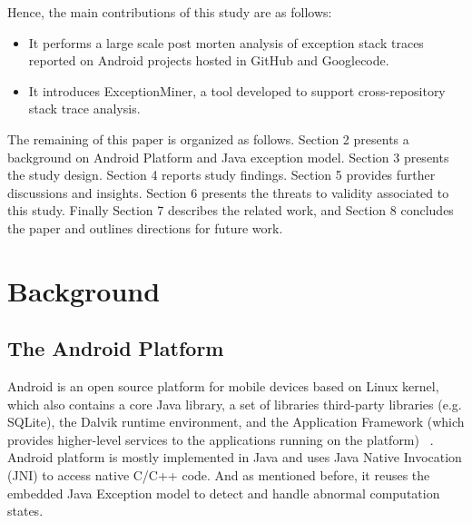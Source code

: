 \documentclass[conference]{IEEEtran}
\begin{document}
Hence, the main contributions of this study are as follows:
\begin{itemize}

  \item  It performs a large scale post morten analysis of exception stack traces reported on Android projects hosted in GitHub and Googlecode.

  \item  It introduces ExceptionMiner, a tool developed to support cross-repository stack trace
    analysis.

\end{itemize}



The remaining of this paper is organized as follows. Section 2 presents a
background on Android Platform and Java exception model. 
Section 3 presents the study design. Section 4 reports study findings. 
Section 5 provides further discussions and insights.
Section 6 presents the threats to validity associated to this study. Finally Section
7 describes the related work, and Section 8 concludes the paper and outlines
directions for future work.

\section{Background}
\label{sec:back}

\subsection{The Android Platform} \label{sec:extypes}

Android is an open source platform for mobile devices based on Linux kernel,
which also contains  a core Java library, a set of libraries third-party libraries (e.g.  SQLite),
the Dalvik runtime environment, and the Application Framework (which provides 
higher-level services to the applications running on the platform) ~\cite{andguide}.
Android platform is mostly implemented in Java and uses Java Native Invocation (JNI) to access native C/C++ code. 
And as mentioned before, it reuses the embedded Java Exception model to detect and handle 
abnormal computation states.
\end{document}
